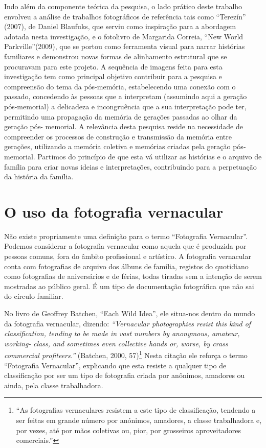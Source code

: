 \documentclass{article}
\begin{document}
Indo  além  da  componente  teórica  da  pesquisa,  o  lado  prático  deste  trabalho 
envolveu a análise de trabalhos fotográficos de referência tais como “Terezín” (2007), de 
Daniel  Blaufuks,  que  serviu  como  inspiração  para  a  abordagem  adotada  nesta 
investigação, e o fotolivro de Margarida Correia, “New World Parkville”(2009), que se 
portou como ferramenta visual para narrar histórias familiares e demonstrou novas formas 
de alinhamento estrutural que se procuravam para este projeto.  
A sequência de imagens feita para esta investigação tem como principal objetivo 
contribuir para a pesquisa e compreensão do tema da pós-memória, estabelecendo uma 
conexão  com  o  passado,  concedendo  às  pessoas  que  a  interpretam  (assumindo  aqui  a 
geração  pós-memorial)  a  delicadeza  e  incongruência  que  a  sua  interpretação  pode  ter, 
permitindo uma propagação da memória de gerações passadas ao olhar da geração pós-
memorial.  A  relevância  desta  pesquisa  reside  na  necessidade  de  compreender  os 
processos de construção e transmissão da memória entre gerações, utilizando a memória 
coletiva e memórias criadas pela geração pós-memorial. Partimos do princípio de que esta 
vá  utilizar  as  histórias  e  o  arquivo  de  família  para  criar  novas  ideias  e  interpretações, 
contribuindo para a perpetuação da história da família.

\section{O uso da fotografia vernacular }
Não  existe  propriamente  uma  definição  para  o  termo  “Fotografia  Vernacular”. 
Podemos considerar a fotografia vernacular como aquela que é produzida por pessoas 
comuns,  fora  do  âmbito  profissional  e  artístico.  A  fotografia  vernacular  conta  com 
fotografias de arquivo dos álbuns de família, registos do quotidiano como fotografias de 
aniversários e de férias, todas tiradas sem a intenção de serem mostradas ao público geral. 
É um tipo de documentação fotográfica que não sai do círculo familiar.  
 
No livro de Geoffrey Batchen, “Each Wild Idea”, ele situa-nos dentro do mundo 
da  fotografia  vernacular,  dizendo:  \textit{“Vernacular  photographies  resist  this  kind  of }
\textit{classification,  tending  to  be  made  in  vast  numbers  by  anonymous,  amateur,  working-}
\textit{class, and sometimes even collective hands or, worse, by crass commercial profiteers.”} 
(Batchen,  2000,  57)\footnote{“As fotografias vernaculares resistem a este tipo de classificação, tendendo a ser feitas em grande número por anónimos, amadores, a classe trabalhadora e, por vezes, até por mãos coletivas ou, pior, por grosseiros aproveitadores comerciais.” }  Nesta  citação  ele  reforça  o  termo  “Fotografia  Vernacular”, 
explicando que esta resiste a qualquer tipo de classificação por ser um tipo de fotografia 
criada por anônimos, amadores ou ainda, pela classe trabalhadora.  
 
\end{document}
